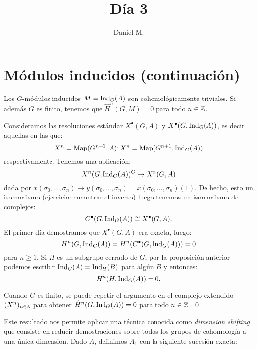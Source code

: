 \documentclass[a4paper,12pt, leqno]{article}
\title{Día 3}
\author{Daniel M.}
\begin{document}
	\section{Módulos inducidos (continuación)}
	\begin{prop}
		Los $G$-módulos inducidos $M=\mathrm{Ind}_G (A)$ son cohomológicamente triviales. Si además $G$ es finito, tenemos que $\hat{H}^n(G,M)=0$ para todo $n \in \mathbb{Z}$.
	\end{prop}
	\begin{dem}
		Consideramos las resoluciones estándar $X^{\bullet}(G,A)$ y $X^{\bullet}(G,\mathrm{Ind}_G (A))$, es decir aquellas en las que:
		\begin{equation*}
		X^n=\mathrm{Map}(G^{n+1},A);X^n=\mathrm{Map}(G^{n+1},\mathrm{Ind}_G (A))
		\end{equation*}
		respectivamente. Tenemos una aplicación:
		\begin{equation*}
		X^n(G,\mathrm{Ind}_G (A))^G \rightarrow X^n(G,A)
		\end{equation*}
		dada por $x(\sigma_0,...,\sigma_n)\mapsto y(\sigma_0,...,\sigma_n)=x(\sigma_0,...,\sigma_n)(1)$. De hecho, esto un isomorfismo (ejercicio: encontrar el inverso) luego tenemos un isomorfismo de complejos:
		\begin{equation*}
		C^{\bullet}(G,\mathrm{Ind}_G (A))\cong X^{\bullet}(G,A).
		\end{equation*}
		El primer día demostramos que $X^{\bullet}(G,A)$ era exacta, luego:
		\begin{equation*}
		H^n(G,\mathrm{Ind}_G (A))=H^n(C^{\bullet}(G,\mathrm{Ind}_G (A)))=0
		\end{equation*}
		para $n\geq 1$. Si $H$ es  un subgrupo cerrado de $G$, por la proposición anterior podemos escribir $\mathrm{Ind}_G (A)=\mathrm{Ind}_H(B)$ para algún $B$ y entonces: 
		\begin{equation*}
		H^n(H,\mathrm{Ind}_G (A))=0.
		\end{equation*}
		
		Cuando $G$ es finito, se puede repetir el argumento en el complejo extendido $(X^n)_{n \in \mathbb{Z}}$ para obtener $\hat{H}^n(G, \mathrm{Ind}_G (A))=0$ para todo $n \in \mathbb{Z}$. \qed
	\end{dem}
	Este resultado nos permite aplicar una técnica conocida como \textit{dimension shifting} que consiste en reducir demostraciones sobre todos los grupos de cohomología a una única dimension. Dado $A$, definimos $A_1$ con la siguiente sucesión exacta:
	\begin{center}
	\end{center}
\end{document}
